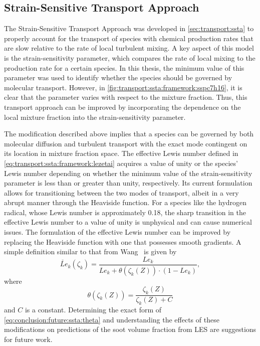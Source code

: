 \subsection{Strain-Sensitive Transport Approach}
\label{sec:conclusion:future:ssta}

The Strain-Sensitive Transport Approach was developed in \cref{sec:transport:ssta} to properly account for the transport of species with chemical production rates that are slow relative to the rate of local turbulent mixing. A key aspect of this model is the strain-sensitivity parameter, which compares the rate of local mixing to the production rate for a certain species. In this thesis, the minimum value of this parameter was used to identify whether the species should be governed by molecular transport. However, in \cref{fig:transport:ssta:framework:sspc7h16}, it is clear that the parameter varies with respect to the mixture fraction. Thus, this transport approach can be improved by incorporating the dependence on the local mixture fraction into the strain-sensitivity parameter.

The modification described above implies that a species can be governed by both molecular diffusion and turbulent transport with the exact mode contingent on its location in mixture fraction space. The effective Lewis number defined in \cref{eq:transport:ssta:framework:lezetai} acquires a value of unity or the species' Lewis number depending on whether the minimum value of the strain-sensitivity parameter is less than or greater than unity, respectively. Its current formulation allows for transitioning between the two modes of transport, albeit in a very abrupt manner through the Heaviside function. For a species like the hydrogen radical, whose Lewis number is approximately 0.18, the sharp transition in the effective Lewis number to a value of unity is unphysical and can cause numerical issues. The formulation of the effective Lewis number can be improved by replacing the Heaviside function with one that possesses smooth gradients. A simple definition similar to that from Wang~\cite{wang2016} is given by
\begin{equation}\label{eq:conclusion:future:ssta:lezetai}
  \check{Le}_k(\zeta_k) = \frac{Le_k}{Le_k + \theta(\zeta_k(Z)) \cdot (1 - Le_k)},
\end{equation}
where
\begin{equation}\label{eq:conclusion:future:ssta:theta}
  \theta(\zeta_k(Z)) = \frac{\zeta_k(Z)}{\zeta_k(Z) + C}
\end{equation}
and $C$ is a constant. Determining the exact form of \cref{eq:conclusion:future:ssta:theta} and understanding the effects of these modifications on predictions of the soot volume fraction from LES are suggestions for future work.

